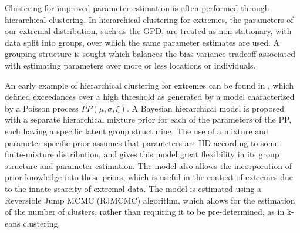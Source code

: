 \documentclass{article}
\numberwithin{equation}{section}
\begin{document}


Clustering for improved parameter estimation is often performed through hierarchical clustering.
In hierarchical clustering for extremes, the parameters of our extremal distribution, such as the GPD, are treated as non-stationary, with data split into groups, over which the same parameter estimates are used. 
A grouping structure is sought which balances the bias-variance tradeoff associated with estimating parameters over more or less locations or individuals.

An early example of hierarchical clustering for extremes can be found in \citet{Bottolo2003}, which defined exceedances over a high threshold as generated by a model characterised by a Poisson process $PP(\mu, \sigma, \xi)$.
A Bayesian hierarchical model is proposed with a separate hierarchical mixture prior for each of the parameters of the PP, each having a specific latent group structuring.
The use of a mixture and parameter-specific prior assumes that parameters are IID according to some finite-mixture distribution, and gives this model great flexibility in its group structure and parameter estimation. 
The model also allows the incorporation of prior knowledge into these priors, which is useful in the context of extremes due to the innate scarcity of extremal data.
The model is estimated using a Reversible Jump MCMC (RJMCMC) algorithm, which allows for the estimation of the number of clusters, rather than requiring it to be pre-determined, as in k-eans clustering. 
\end{document}
